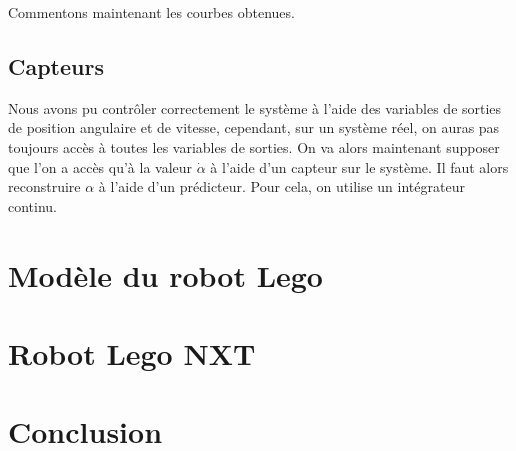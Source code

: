 \documentclass[11pt,french]{article} %
\begin{document}

Commentons maintenant les courbes obtenues. \\




\subsection{Capteurs}

Nous avons pu contrôler correctement le système à l'aide des variables de sorties de position angulaire et de vitesse, cependant, sur un système réel, on auras pas toujours accès à toutes les variables de sorties. On va alors maintenant supposer que l'on a accès qu'à la valeur $\dot\alpha$ à l'aide d'un capteur sur le système. Il faut alors reconstruire $\alpha$ à l'aide d'un prédicteur. Pour cela, on utilise un intégrateur continu. \\




\newpage
\section{Modèle du robot Lego}

\newpage
\section{Robot Lego NXT}

\newpage
\section{Conclusion}
\end{document}
